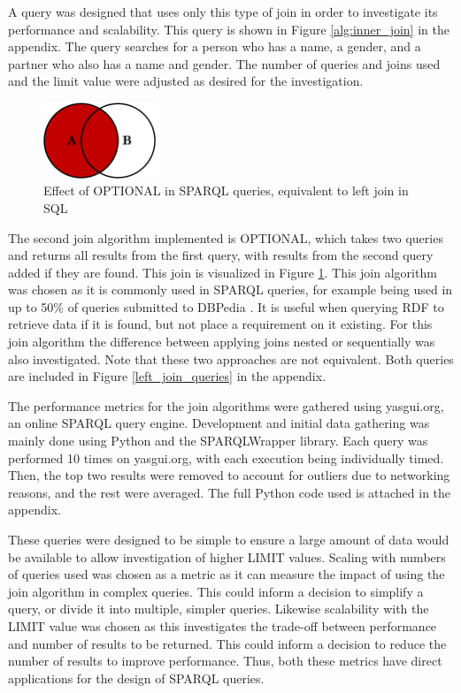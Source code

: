 \documentclass[10pt,a4paper]{article}
\begin{document}
	A query was designed that uses only this type of join in order to investigate its performance and scalability. This query is shown in Figure \ref{alg:inner_join} in the appendix. The query searches for a person who has a name, a gender, and a partner who also has a name and gender. The number of queries and joins used and the limit value were adjusted as desired for the investigation.
	
	\begin{figure}
		\vspace{-1em}
		\centering
		\includegraphics[width=0.3\textwidth]{figures/left_join}
		\caption{Effect of OPTIONAL in SPARQL queries, equivalent to left join in SQL \cite{Moffatt}}
		\label{left_join}
		\vspace{-1em}
	\end{figure}
	
	The second join algorithm implemented is OPTIONAL, which takes two queries and returns all results from the first query, with results from the second query added if they are found. This join is visualized in Figure \ref{left_join}. This join algorithm was chosen as it is commonly used in SPARQL queries, for example being used in up to 50\% of queries submitted to DBPedia \cite{Atre}. It is useful when querying RDF to retrieve data if it is found, but not place a requirement on it existing. For this join algorithm the difference between applying joins nested or sequentially was also investigated. Note that these two approaches are not equivalent. Both queries are included in Figure \ref{left_join_queries} in the appendix.
	
	The performance metrics for the join algorithms were gathered using yasgui.org, an online SPARQL query engine. Development and initial data gathering was mainly done using Python and the SPARQLWrapper library. Each query was performed 10 times on yasgui.org, with each execution being individually timed. Then, the top two results were removed to account for outliers due to networking reasons, and the rest were averaged. The full Python code used is attached in the appendix.
	
	These queries were designed to be simple to ensure a large amount of data would be available to allow investigation of higher LIMIT values. Scaling with numbers of queries used was chosen as a metric as it can measure the impact of using the join algorithm in complex queries. This could inform a decision to simplify a query, or divide it into multiple, simpler queries. Likewise scalability with the LIMIT value was chosen as this investigates the trade-off between performance and number of results to be returned. This could inform a decision to reduce the number of results to improve performance. Thus, both these metrics have direct applications for the design of SPARQL queries.
	
\end{document}
